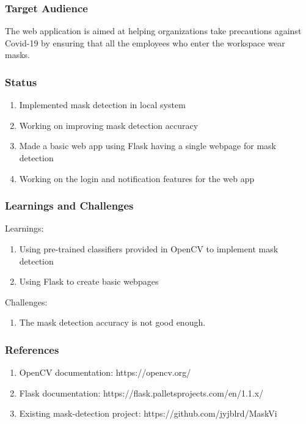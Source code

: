 \documentclass[14pt]{beamer}
\begin{document}
\begin{frame}
    \frametitle{Target Audience}
    The web application is  aimed at helping organizations take precautions against Covid-19 by ensuring that all the employees who enter the workspace wear masks.
\end{frame}

\begin{frame}
    \frametitle{Status}
    \begin{enumerate}
        \item Implemented mask detection in local system
        \item Working on improving mask detection accuracy
        \item Made a basic web app using Flask having a single webpage for mask detection
        \item Working on the login and notification features for the web app
    \end{enumerate}
\end{frame}

\begin{frame}
    \frametitle{Learnings and Challenges}
    Learnings:
    \begin{enumerate}
        \item Using pre-trained classifiers provided in OpenCV to implement mask detection
        \item Using Flask to create basic webpages
    \end{enumerate}
    Challenges:
    \begin{enumerate}
        \item The mask detection accuracy is not good enough.
    \end{enumerate}
\end{frame}

\begin{frame}
    \frametitle{References}
    \begin{enumerate}
        \item OpenCV documentation: https://opencv.org/
        \item Flask documentation: https://flask.palletsprojects.com/en/1.1.x/
        \item Existing mask-detection project: https://github.com/jyjblrd/MaskVi
    \end{enumerate}
\end{frame}
\end{document}
